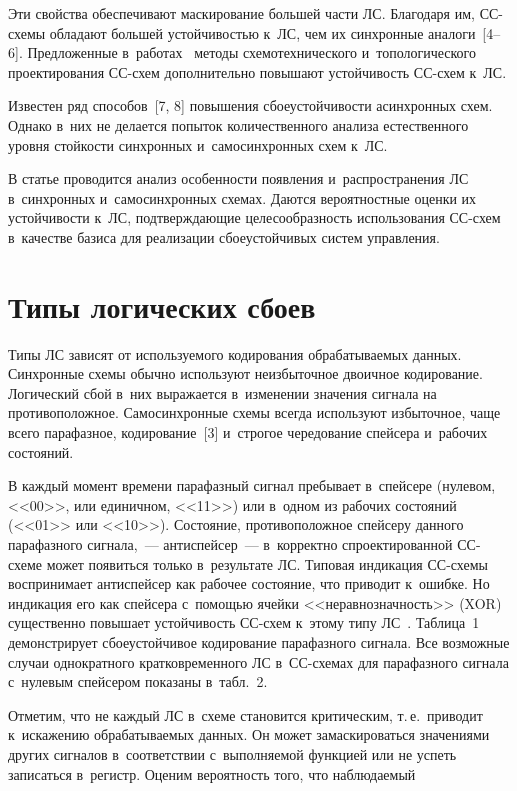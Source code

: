 \begin{multicols}{2}
  Эти свойства обеспечивают маскирование большей части ЛС. Благодаря им, 
СС-схемы обладают большей устойчивостью к~ЛС, чем их синхронные 
аналоги~[4--6]. Предложенные в~работах~\cite{4-sok, 5-sok} методы 
схемотехнического и~топологического проектирования СС-схем дополнительно 
повышают устойчивость СС-схем к~ЛС.
  
  Известен ряд способов~[7, 8] повышения сбоеустойчивости асинхронных 
схем. Однако в~них не делается попыток количественного анализа 
естественного уровня стойкости синхронных и~самосинхронных схем к~ЛС.
  
  В статье проводится анализ особенности появления и~распространения ЛС 
в~синхронных и~самосинхронных схе\-мах. Даются вероятностные оценки их устойчивости 
к~ЛС, подтверждающие целесообразность использования СС-схем в~качестве 
базиса для реализации сбоеустойчивых систем управления.
  
\section{Типы логических сбоев}

  Типы ЛС зависят от используемого кодирования обрабатываемых данных. 
Синхронные схемы обычно используют неизбыточное двоичное кодирование. 
Логический сбой в~них выражается в~изменении значения сигнала на противоположное.  
Самосинхронные схе\-мы всегда используют избыточное, чаще всего парафазное, 
кодирование~[3] и~строгое чередование спейсера и~рабочих со\-сто\-яний. 
  
  В каждый момент времени парафазный сигнал пребывает в~спейсере 
(нулевом, <<00>>, или единичном, <<11>>) или в~одном из рабочих состояний 
(<<01>> или <<10>>). Состояние, противоположное спейсеру данного 
парафазного сигнала,~--- антиспейсер~--- в~корректно спроектированной  
СС-схе\-ме может появиться только в~результате ЛС. Типовая индикация  
СС-схе\-мы воспринимает антиспейсер как рабочее состояние, что приводит 
к~ошибке. Но индикация его как спейсера с~помощью ячейки 
<<неравнозначность>> (XOR) существенно повышает устойчивость СС-схем 
к~этому типу ЛС~\cite{4-sok}. Таблица~1 демонстрирует сбоеустойчивое 
кодирование парафазного сигнала. Все возможные случаи однократного 
кратковременного ЛС в~СС-схе\-мах для парафазного сигнала с~нулевым 
спейсером показаны в~табл.~2.



  
  Отметим, что не каждый ЛС в~схеме становится критическим, т.\,е.\ приводит к~искажению обрабатываемых данных. Он может замаскироваться значениями 
других сигналов в~соответствии с~выполняемой функцией или не успеть 
записаться в~регистр. Оценим вероятность того, что наблюдаемый\linebreak\vspace*{-12pt}


\end{multicols}

